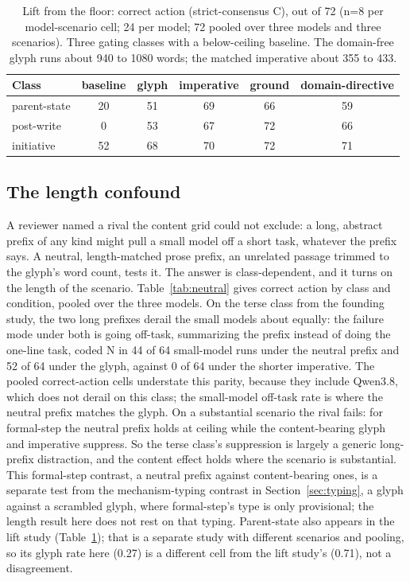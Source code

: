 \documentclass[11pt,a4paper]{article}
\begin{document}
\begin{table}[h]
\centering
\small
\caption{Lift from the floor: correct action (strict-consensus C), out of 72 (n=8 per
  model-scenario cell; 24 per model; 72 pooled over three models and three scenarios).
  Three gating classes with a below-ceiling baseline. The domain-free glyph runs about
  940 to 1080 words; the matched imperative about 355 to 433.}
\label{tab:h1}
\begin{tabular}{@{}lccccc@{}}
\toprule
Class & baseline & glyph & imperative & ground & domain-directive \\
\midrule
parent-state & 20 & 51 & 69 & 66 & 59 \\
post-write   & 0  & 53 & 67 & 72 & 66 \\
initiative   & 52 & 68 & 70 & 72 & 71 \\
\bottomrule
\end{tabular}
\end{table}

\subsection{The length confound}\label{sec:length}

A reviewer named a rival the content grid could not exclude: a long, abstract prefix of
any kind might pull a small model off a short task, whatever the prefix says. A
neutral, length-matched prose prefix, an unrelated passage trimmed to the glyph's word
count, tests it. The answer is class-dependent, and it turns on the length of the
scenario. Table~\ref{tab:neutral} gives correct action by class and condition, pooled over the
three models. On the terse class from the founding study, the two long prefixes derail
the small models about equally: the failure mode under both is going off-task, summarizing
the prefix instead of doing the one-line task, coded N in 44 of 64 small-model runs under
the neutral prefix and 52 of 64 under the glyph, against 0 of 64 under the shorter
imperative. The pooled correct-action cells understate this parity, because they include
Qwen3.8, which does not derail on this class; the small-model off-task rate is where the
neutral prefix matches the glyph. On a substantial scenario the rival fails: for formal-step the neutral
prefix holds at ceiling while the content-bearing glyph and imperative suppress. So the
terse class's suppression is largely a generic long-prefix distraction, and the content
effect holds where the scenario is substantial. This formal-step contrast, a neutral
prefix against content-bearing ones, is a separate test from the mechanism-typing contrast
in Section~\ref{sec:typing}, a glyph against a scrambled glyph, where formal-step's type is
only provisional; the length result here does not rest on that typing. Parent-state also appears in the lift
study (Table~\ref{tab:h1}); that is a separate study with different scenarios and pooling,
so its glyph rate here (0.27) is a different cell from the lift study's (0.71), not a
disagreement.
\end{document}

